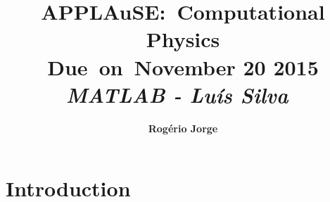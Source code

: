 


\newcommand{\hmwkTitle}{Computational Physics} %
\newcommand{\hmwkDueDate}{November 20 2015} %
\newcommand{\hmwkClass}{APPLAuSE} %
\newcommand{\hmwkClassTime}{} %
\newcommand{\hmwkClassInstructor}{MATLAB - Lu\'is Silva} %
\newcommand{\hmwkAuthorName}{Rog\'erio Jorge} %


\title{
\vspace{2in}
\textmd{\textbf{\hmwkClass:\ \hmwkTitle}}\\
\normalsize\vspace{0.1in}\small{Due\ on\ \hmwkDueDate}\\
\vspace{0.1in}\large{\textit{\hmwkClassInstructor\ \hmwkClassTime}}
\vspace{3in}
}

\author{\textbf{\hmwkAuthorName}}
\date{} %




\maketitle
\thispagestyle{empty}


\newpage
\tableofcontents
\newpage


\section{Introduction}

